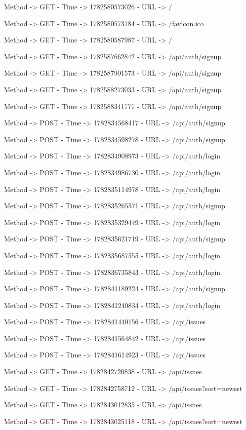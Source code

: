 
Method -> GET - Time -> 1782580573026 - URL -> /

Method -> GET - Time -> 1782580573184 - URL -> /favicon.ico

Method -> GET - Time -> 1782580587987 - URL -> /

Method -> GET - Time -> 1782587662842 - URL -> /api/auth/signup

Method -> GET - Time -> 1782587901573 - URL -> /api/auth/signup

Method -> GET - Time -> 1782588273033 - URL -> /api/auth/signup

Method -> GET - Time -> 1782588341777 - URL -> /api/auth/signup

Method -> POST - Time -> 1782834568417 - URL -> /api/auth/signup

Method -> POST - Time -> 1782834598278 - URL -> /api/auth/signup

Method -> POST - Time -> 1782834908973 - URL -> /api/auth/login

Method -> POST - Time -> 1782834986730 - URL -> /api/auth/login

Method -> POST - Time -> 1782835114978 - URL -> /api/auth/login

Method -> POST - Time -> 1782835265571 - URL -> /api/auth/signup

Method -> POST - Time -> 1782835329449 - URL -> /api/auth/login

Method -> POST - Time -> 1782835621719 - URL -> /api/auth/signup

Method -> POST - Time -> 1782835687555 - URL -> /api/auth/login

Method -> POST - Time -> 1782836735843 - URL -> /api/auth/login

Method -> POST - Time -> 1782841189224 - URL -> /api/auth/signup

Method -> POST - Time -> 1782841240834 - URL -> /api/auth/login

Method -> POST - Time -> 1782841440156 - URL -> /api/issues

Method -> POST - Time -> 1782841564842 - URL -> /api/issues

Method -> POST - Time -> 1782841614923 - URL -> /api/issues

Method -> GET - Time -> 1782842720838 - URL -> /api/issues

Method -> GET - Time -> 1782842758712 - URL -> /api/issues?sort=newest

Method -> GET - Time -> 1782843012835 - URL -> /api/issues

Method -> GET - Time -> 1782843025118 - URL -> /api/issues?sort=newest

